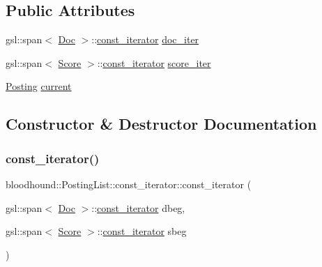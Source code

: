 \subsection*{Public Attributes}
\begin{DoxyCompactItemize}
\item 
gsl\+::span$<$ \hyperlink{structbloodhound_1_1Doc}{Doc} $>$\+::\hyperlink{structbloodhound_1_1PostingList_1_1const__iterator}{const\+\_\+iterator} \hyperlink{structbloodhound_1_1PostingList_1_1const__iterator_a6eddc76eb3741c66f9bf3b7d99312087}{doc\+\_\+iter}
\item 
gsl\+::span$<$ \hyperlink{structbloodhound_1_1Score}{Score} $>$\+::\hyperlink{structbloodhound_1_1PostingList_1_1const__iterator}{const\+\_\+iterator} \hyperlink{structbloodhound_1_1PostingList_1_1const__iterator_ade7c448dfba393cc9e34a901461b6b77}{score\+\_\+iter}
\item 
\hyperlink{structbloodhound_1_1Posting}{Posting} \hyperlink{structbloodhound_1_1PostingList_1_1const__iterator_a97406308f5973366ea220f68c0d515d7}{current}
\end{DoxyCompactItemize}


\subsection{Constructor \& Destructor Documentation}
\mbox{\label{structbloodhound_1_1PostingList_1_1const__iterator_acdd2e534f35cf6e082cc9d126b36f3b4}} 
\subsubsection{\texorpdfstring{const\+\_\+iterator()}{const\_iterator()}}
{\footnotesize\ttfamily bloodhound\+::\+Posting\+List\+::const\+\_\+iterator\+::const\+\_\+iterator (\begin{DoxyParamCaption}\item[{gsl\+::span$<$ \hyperlink{structbloodhound_1_1Doc}{Doc} $>$\+::\hyperlink{structbloodhound_1_1PostingList_1_1const__iterator}{const\+\_\+iterator}}]{dbeg,  }\item[{gsl\+::span$<$ \hyperlink{structbloodhound_1_1Score}{Score} $>$\+::\hyperlink{structbloodhound_1_1PostingList_1_1const__iterator}{const\+\_\+iterator}}]{sbeg }\end{DoxyParamCaption})\hspace{0.3cm}{\ttfamily [inline]}}



